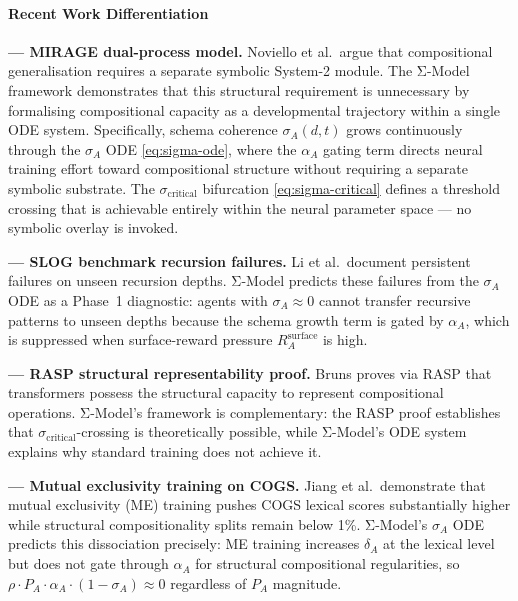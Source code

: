 \documentclass[11pt,a4paper]{article}
\begin{document}
\paragraph{Recent Work Differentiation}

\textbf{\cite{noviello2025neuroscienceinspiredualprocess} --- MIRAGE dual-process model.}
Noviello et al.\ argue that compositional generalisation requires a
separate symbolic System-2 module. The Σ-Model framework demonstrates that
this structural requirement is unnecessary by formalising compositional
capacity as a developmental trajectory within a single ODE system.
Specifically, schema coherence $\sigma_A(d,t)$ grows continuously
through the $\sigma_A$ ODE \eqref{eq:sigma-ode}, where the
$\alpha_A$ gating term directs neural training effort toward
compositional structure without requiring a separate symbolic substrate.
The $\sigma_{\text{critical}}$ bifurcation \eqref{eq:sigma-critical}
defines a threshold crossing that is achievable entirely within the
neural parameter space --- no symbolic overlay is invoked.

\textbf{\cite{li2023slogstructuralgeneralizationbenchmark} --- SLOG benchmark recursion failures.}
Li et al.\ document persistent failures on unseen recursion depths.
Σ-Model predicts these failures from the $\sigma_A$ ODE as a Phase~1
diagnostic: agents with $\sigma_A \approx 0$ cannot transfer recursive
patterns to unseen depths because the schema growth term is gated by
$\alpha_A$, which is suppressed when surface-reward pressure
$R_A^{\text{surface}}$ is high.

\textbf{\cite{bruns2025exploringcompositionalgeneralizationin} --- RASP structural representability proof.}
Bruns proves via RASP that transformers possess the structural capacity
to represent compositional operations. Σ-Model's framework is
complementary: the RASP proof establishes that
$\sigma_{\text{critical}}$-crossing is theoretically possible, while
Σ-Model's ODE system explains why standard training does not achieve it.

\textbf{\cite{jiang2022mutualexclusivity} --- Mutual exclusivity training on COGS.}
Jiang et al.\ demonstrate that mutual exclusivity (ME) training pushes
COGS lexical scores substantially higher while structural
compositionality splits remain below 1\%. Σ-Model's $\sigma_A$ ODE
predicts this dissociation precisely: ME training increases
$\delta_A$ at the lexical level but does not gate through $\alpha_A$
for structural compositional regularities, so
$\rho \cdot P_A \cdot \alpha_A \cdot (1 - \sigma_A) \approx 0$
regardless of $P_A$ magnitude.
\end{document}
